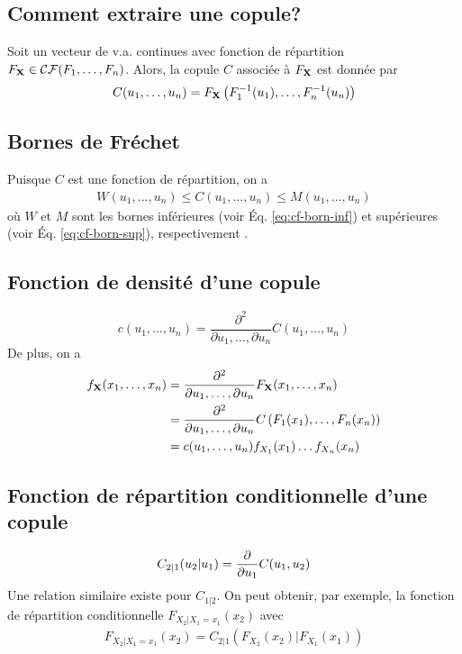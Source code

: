 \documentclass[10pt, french]{article}
\begin{document}
\begin{multicols*}{2}
\subsection{Comment extraire une copule?}
Soit un vecteur de v.a. continues avec fonction de répartition $F_{\mathbf{X}} \in \mathcal{CF}(F_1, \dots, F_n)$. Alors, la copule $C$ associée à $F_{\mathbf{X}}$ est donnée par
\begin{equation}
C(u_1, \dots, u_n) = F_{\mathbf{X}} \left (F_1^{-1}(u_1), \dots, F_n^{-1}(u_n) \right)
\end{equation}

\subsection{Bornes de Fréchet}
Puisque $C$ est une fonction de répartition, on a
\begin{align*}
W(u_1, \dots, u_n) \leq C(u_1, \dots, u_n) \leq M(u_1, \dots, u_n)
\end{align*}
où $W$ et $M$ sont les bornes inférieures (voir Éq. \ref{eq:cf-born-inf}) et supérieures (voir Éq.  \ref{eq:cf-born-sup}), respectivement .

\subsection{Fonction de densité d'une copule}
\begin{equation}
c(u_1, \dots, u_n) = \frac{\partial^2}{\partial u_1, \dots, \partial u_n} C(u_1, \dots, u_n)
\end{equation}
De plus, on a
\begin{align*}
f_{\mathbf{X}}(x_1, \dots, x_n)	& =  \frac{\partial^2}{\partial u_1, \dots, \partial u_n} F_{\mathbf{X}}(x_1, \dots, x_n) \\
& =   \frac{\partial^2}{\partial u_1, \dots, \partial u_n} C\left( F_1(x_1), \dots, F_n(x_n) \right) \\
& = c(u_1, \dots, u_n) f_{X_1}(x_1) \dots f_{X_n}(x_n)
\end{align*}

\subsection{Fonction de répartition conditionnelle d'une copule}
\begin{equation}
\label{eq:repart-cond-copule}
C_{2|1}(u_2 | u_1) = \frac{\partial}{\partial u_1} C(u_1, u_2)
\end{equation}
Une relation similaire existe pour $C_{1|2}$. On peut obtenir, par exemple, la fonction de répartition conditionnelle $F_{X_2 | X_1 = x_1}(x_2)$ avec
\begin{align*}
F_{X_2 | X_1 = x_1}(x_2) = C_{2|1} \left( F_{X_2}(x_2) | F_{X_1}(x_1) \right)
\end{align*}



\end{multicols*}
\end{document}
